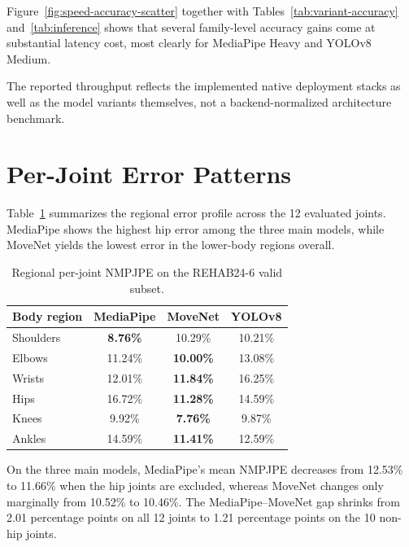 Figure~\ref{fig:speed-accuracy-scatter} together with Tables~\ref{tab:variant-accuracy} and~\ref{tab:inference} shows that several family-level accuracy gains come at substantial latency cost, most clearly for MediaPipe Heavy and YOLOv8 Medium.

The reported throughput reflects the implemented native deployment stacks as well as the model variants themselves, not a backend-normalized architecture benchmark.

\section{Per-Joint Error Patterns}
\label{sec:perjoint-results}

Table~\ref{tab:perjoint} summarizes the regional error profile across the 12 evaluated joints. MediaPipe shows the highest hip error among the three main models, while MoveNet yields the lowest error in the lower-body regions overall.

\begin{table}[htbp]
  \centering
  \caption{Regional per-joint NMPJPE on the REHAB24-6 valid subset.}
  \label{tab:perjoint}
  \begin{tabular}{lccc}
    \toprule
    Body region & MediaPipe & MoveNet & YOLOv8 \\
    \midrule
    Shoulders & \textbf{8.76\%} & 10.29\% & 10.21\% \\
    Elbows    & 11.24\% & \textbf{10.00\%} & 13.08\% \\
    Wrists    & 12.01\% & \textbf{11.84\%} & 16.25\% \\
    Hips      & 16.72\% & \textbf{11.28\%} & 14.59\% \\
    Knees     & 9.92\% & \textbf{7.76\%} & 9.87\% \\
    Ankles    & 14.59\% & \textbf{11.41\%} & 12.59\% \\
    \bottomrule
  \end{tabular}
\end{table}

On the three main models, MediaPipe's mean NMPJPE decreases from 12.53\% to 11.66\% when the hip joints are excluded, whereas MoveNet changes only marginally from 10.52\% to 10.46\%. The MediaPipe--MoveNet gap shrinks from 2.01 percentage points on all 12 joints to 1.21 percentage points on the 10 non-hip joints.

